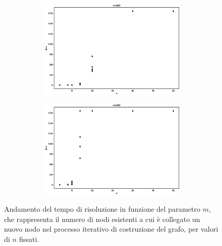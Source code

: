 \begin{figure}[h!]
\begin{subfigure}[b]{\textwidth}
\begin{subfigure}[b]{0.32\textwidth}
	         \includegraphics[width=\columnwidth]{images/bagm4.eps}
	     \end{subfigure}
	     \hspace{0em}
	      \begin{subfigure}[b]{0.32\textwidth}
	         \includegraphics[width=\columnwidth]{images/bagm5.eps}
	     \end{subfigure}
		\end{subfigure}
        \caption{Andamento del tempo di risoluzione in funzione del parametro $m$, che rappresenta il numero di nodi esistenti a cui è collegato un nuovo nodo nel processo iterativo di costruzione del grafo, per valori di $n$ fissati.}
        \label{fig:bagma}
\end{figure}

